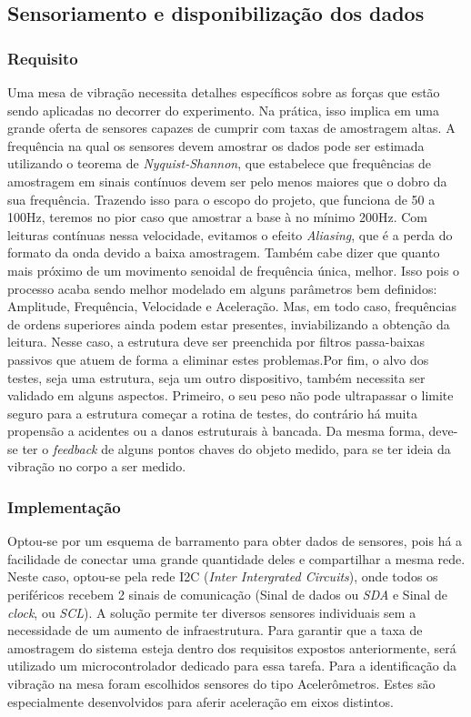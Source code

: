 \label{desenvolvimento_eletroeletronica}

  \subsection{Sensoriamento e disponibilização dos dados}
  \subsubsection{Requisito}
  Uma mesa de vibração necessita detalhes específicos sobre as forças que estão sendo aplicadas no decorrer do experimento. Na prática, isso implica em uma grande oferta de sensores capazes de cumprir com taxas de amostragem altas. A frequência na qual os sensores devem amostrar os dados pode ser estimada utilizando o teorema de \textit{Nyquist-Shannon}, que estabelece que frequências de amostragem em sinais contínuos devem ser pelo menos maiores que o dobro da sua frequência. Trazendo isso para o escopo do projeto, que funciona de 50 a 100Hz, teremos no pior caso que amostrar a base à no mínimo 200Hz. Com leituras contínuas nessa velocidade, evitamos o efeito \textit{Aliasing}, que é a perda do formato da onda devido a baixa amostragem. Também cabe dizer que quanto mais próximo de um movimento senoidal de frequência única, melhor. Isso pois o processo acaba sendo melhor modelado em alguns parâmetros bem definidos: Amplitude, Frequência, Velocidade e Aceleração. Mas, em todo caso, frequências de ordens superiores ainda podem estar presentes, inviabilizando a obtenção da leitura. Nesse caso, a estrutura deve ser preenchida por filtros passa-baixas passivos que atuem de forma a eliminar estes problemas.Por fim, o alvo dos testes, seja uma estrutura, seja um outro dispositivo, também necessita ser validado em alguns aspectos. Primeiro, o seu peso não pode ultrapassar o limite seguro para a estrutura começar a rotina de testes, do contrário há muita propensão a acidentes ou a danos estruturais à bancada. Da mesma forma, deve-se ter o \textit{feedback} de alguns pontos chaves do objeto medido, para se ter ideia da vibração no corpo a ser medido.
  \subsubsection{Implementação}
Optou-se por um esquema de barramento para obter dados de sensores, pois há a facilidade de conectar uma grande quantidade deles e compartilhar a mesma rede. Neste caso, optou-se pela rede I2C (\textit{Inter Intergrated Circuits}), onde todos os periféricos recebem 2 sinais de comunicação (Sinal de dados ou \textit{SDA} e Sinal de \textit{clock}, ou \textit{SCL}). A solução permite ter diversos sensores individuais sem a necessidade de um aumento de infraestrutura. Para garantir que a taxa de amostragem do sistema esteja dentro dos requisitos expostos anteriormente, será utilizado um microcontrolador dedicado para essa tarefa. Para a identificação da vibração na mesa foram escolhidos sensores do tipo Acelerômetros. Estes são especialmente desenvolvidos para aferir aceleração em eixos distintos.
